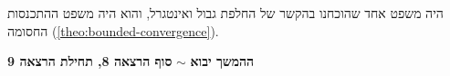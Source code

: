 \documentclass[name=רשימות פונקציות ממשיות – WIP]{../../../tex/classes/noChapterMegasumPreamble}
\newcommand \lectext[1] {{\color{blue}\textbf{#1}}}
\newcommand \nthlec[2]  {\lectext{סוף הרצאה #1, תחילת הרצאה #2}}
\begin{document}
	
	היה משפט אחד שהוכחנו בהקשר של החלפת גבול ואינטגרל, והוא היה משפט ההתכנסות החסומה (\ref{theo:bounded-convergence}). 
	
	
	
	\textbf{ההמשך יבוא} $\sim$ \nthlec{8}{9}
	
	
	
	
	
	
	
	\ndoc
\end{document}
